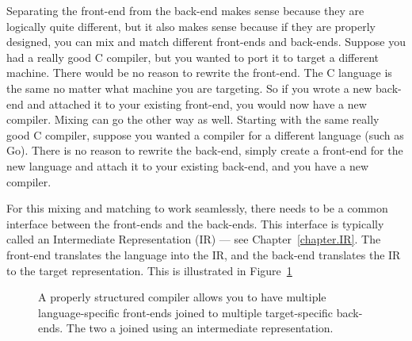 \documentclass[letterpaper,12pt,openany,reqno]{book}%
\begin{document}
Separating the front-end from the back-end makes sense because they are logically quite different, but it also makes sense because if they are properly designed, you can mix and match different front-ends and back-ends. Suppose you had a really good C compiler, but you wanted to port it to target a different machine. There would be no reason to rewrite the front-end. The C language is the same no matter what machine you are targeting. So if you wrote a new back-end and attached it to your existing front-end, you would now have a new compiler. Mixing can go the other way as well. Starting with the same really good C compiler, suppose you wanted a compiler for a different language (such as Go). There is no reason to rewrite the back-end, simply create a front-end for the new language and attach it to your existing back-end, and you have a new compiler.

For this mixing and matching to work seamlessly, there needs to be a common interface between the front-ends and the back-ends. This interface is typically called an Intermediate Representation (IR) --- see Chapter~\ref{chapter.IR}. The front-end translates the language into the IR, and the back-end translates the IR to the target representation. This is illustrated in Figure~\ref{figure.compiler_structure}

\begin{figure}[hbt]
\centering
{}
 \caption[Compiler Structure]{A properly structured compiler allows you to have multiple language-specific front-ends joined to multiple target-specific back-ends. The two a joined using an intermediate representation.}
  \label{figure.compiler_structure}
\end{figure}
\end{document}
